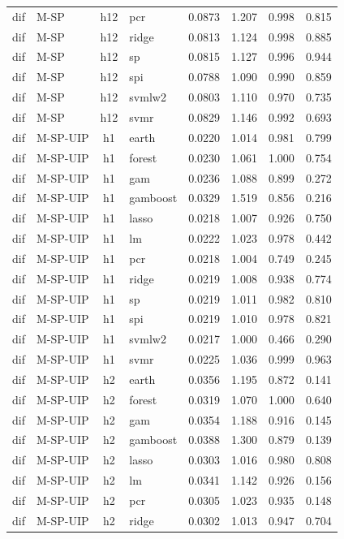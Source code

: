\begin{ThreePartTable}
\begin{longtable}[t]{llclcccc}
dif & M-SP & h12 & pcr & 0.0873 & 1.207 & 0.998 & 0.815\\
dif & M-SP & h12 & ridge & 0.0813 & 1.124 & 0.998 & 0.885\\
dif & M-SP & h12 & sp & 0.0815 & 1.127 & 0.996 & 0.944\\
dif & M-SP & h12 & spi & 0.0788 & 1.090 & 0.990 & 0.859\\
dif & M-SP & h12 & svmlw2 & 0.0803 & 1.110 & 0.970 & 0.735\\
dif & M-SP & h12 & svmr & 0.0829 & 1.146 & 0.992 & 0.693\\
\addlinespace
dif & M-SP-UIP & h1 & earth & 0.0220 & 1.014 & 0.981 & 0.799\\
dif & M-SP-UIP & h1 & forest & 0.0230 & 1.061 & 1.000 & 0.754\\
dif & M-SP-UIP & h1 & gam & 0.0236 & 1.088 & 0.899 & 0.272\\
dif & M-SP-UIP & h1 & gamboost & 0.0329 & 1.519 & 0.856 & 0.216\\
dif & M-SP-UIP & h1 & lasso & 0.0218 & 1.007 & 0.926 & 0.750\\
dif & M-SP-UIP & h1 & lm & 0.0222 & 1.023 & 0.978 & 0.442\\
dif & M-SP-UIP & h1 & pcr & 0.0218 & 1.004 & 0.749 & 0.245\\
dif & M-SP-UIP & h1 & ridge & 0.0219 & 1.008 & 0.938 & 0.774\\
dif & M-SP-UIP & h1 & sp & 0.0219 & 1.011 & 0.982 & 0.810\\
dif & M-SP-UIP & h1 & spi & 0.0219 & 1.010 & 0.978 & 0.821\\
dif & M-SP-UIP & h1 & svmlw2 & 0.0217 & 1.000 & 0.466 & 0.290\\
dif & M-SP-UIP & h1 & svmr & 0.0225 & 1.036 & 0.999 & 0.963\\
\addlinespace
dif & M-SP-UIP & h2 & earth & 0.0356 & 1.195 & 0.872 & 0.141\\
dif & M-SP-UIP & h2 & forest & 0.0319 & 1.070 & 1.000 & 0.640\\
dif & M-SP-UIP & h2 & gam & 0.0354 & 1.188 & 0.916 & 0.145\\
dif & M-SP-UIP & h2 & gamboost & 0.0388 & 1.300 & 0.879 & 0.139\\
dif & M-SP-UIP & h2 & lasso & 0.0303 & 1.016 & 0.980 & 0.808\\
dif & M-SP-UIP & h2 & lm & 0.0341 & 1.142 & 0.926 & 0.156\\
dif & M-SP-UIP & h2 & pcr & 0.0305 & 1.023 & 0.935 & 0.148\\
dif & M-SP-UIP & h2 & ridge & 0.0302 & 1.013 & 0.947 & 0.704\\

\end{longtable}
\end{ThreePartTable}
